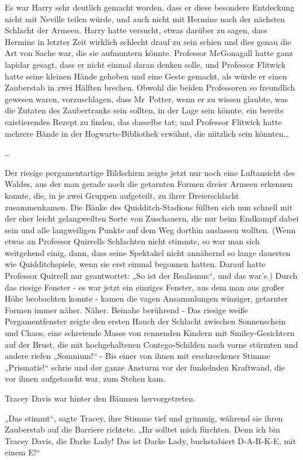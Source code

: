 {Es war Harry sehr deutlich gemacht worden, dass er diese besondere Entdeckung nicht mit Neville teilen würde, und auch nicht mit Hermine nach der nächsten Schlacht der Armeen. Harry hatte versucht, etwas darüber zu sagen, dass Hermine in letzter Zeit wirklich schlecht drauf zu sein schien und dies genau die Art von Sache war, die sie aufmuntern könnte. Professor McGonagall hatte ganz lapidar gesagt, dass er nicht einmal daran denken solle, und Professor Flitwick hatte seine kleinen Hände gehoben und eine Geste gemacht, als würde er einen Zauberstab in zwei Hälften brechen. Obwohl die beiden Professoren so freundlich gewesen waren, vorzuschlagen, dass Mr~Potter, wenn er zu wissen glaubte, was die Zutaten des Zaubertranks sein sollten, in der Lage sein könnte, ein bereits existierendes Rezept zu finden, das dasselbe tat; und Professor Flitwick hatte mehrere Bände in der Hogwarts-Bibliothek erwähnt, die nützlich sein könnten…

…

Der riesige pergamentartige Bildschirm zeigte jetzt nur noch eine Luftansicht des Waldes, aus der man gerade noch die getarnten Formen dreier Armeen erkennen konnte, die, in je zwei Gruppen aufgeteilt, zu ihrer Dreierschlacht zusammenkamen. Die Bänke des Quidditch-Stadions füllten sich nun schnell mit der eher leicht gelangweilten Sorte von Zuschauern, die nur beim Endkampf dabei sein und alle langweiligen Punkte auf dem Weg dorthin auslassen wollten. (Wenn etwas an Professor Quirrells Schlachten nicht stimmte, so war man sich weitgehend einig, dann, dass seine Spektakel nicht annähernd so lange dauerten wie Quidditchspiele, wenn sie erst einmal begonnen hatten. Darauf hatte Professor Quirrell nur geantwortet: „So ist der Realismus“, und das war's.) Durch das riesige Fenster - es war jetzt ein einziges Fenster, aus dem man aus großer Höhe beobachten konnte - kamen die vagen Ansammlungen winziger, getarnter Formen immer näher. Näher. Beinahe berührend - Das riesige weiße Pergamentfenster zeigte den ersten Hauch der Schlacht zwischen Sonnenschein und Chaos, eine schreiende Masse von rennenden Kindern mit Smiley-Gesichtern auf der Brust, die mit hochgehaltenen Contego-Schilden nach vorne stürmten und andere riefen „Somnium!“ - Bis einer von ihnen mit erschrockener Stimme „Prismatis!“ schrie und der ganze Ansturm vor der funkelnden Kraftwand, die vor ihnen aufgetaucht war, zum Stehen kam.

Tracey Davis war hinter den Bäumen hervorgetreten.

„Das stimmt“, sagte Tracey, ihre Stimme tief und grimmig, während sie ihren Zauberstab auf die Barriere richtete. „Ihr solltet mich fürchten. Denn ich bin Tracey Davis, die Darke Lady! Das ist Darke Lady, buchstabiert D-A-R-K-E, mit einem E!“

}
